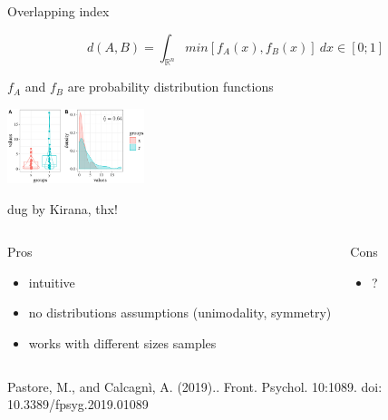 \documentclass{beamer}
\begin{document}
\begin{frame}{Overlapping index}


\begin{scriptsize}

$$d(A,B)= \int_{\mathbb{R}^n} min[f_A(x),f_B(x)]\ dx \in [0;1]$$


$f_A$ and $f_B$ are probability distribution functions

\begin{center}
\includegraphics[width=0.3\textwidth,keepaspectratio]{img/overlappingindex.jpg}
\end{center}


dug by Kirana, thx! 



\begin{columns}[T,onlytextwidth]
\begin{block}{Pros}
\begin{itemize}
  \item intuitive
  \item no distributions assumptions (unimodality, symmetry)
  \item works with different sizes samples
\end{itemize}
\end{block}
\begin{block}{Cons}
\begin{spacing}{0.9}
\begin{itemize}
  \item ?
\end{itemize}
\end{spacing}
\end{block}
\end{columns}
\end{scriptsize}

\begin{tiny}
\begin{singlespace}
Pastore, M., and Calcagnì, A. (2019).\href{https://www.frontiersin.org/articles/10.3389/fpsyg.2019.01089/full}{\color{cyan}{Measuring distribution similarities
between samples: a distribution-free overlapping index}}. Front. Psychol. 10:1089.
doi: 10.3389/fpsyg.2019.01089
\end{singlespace}
\end{tiny}

\end{frame}
\end{document}
